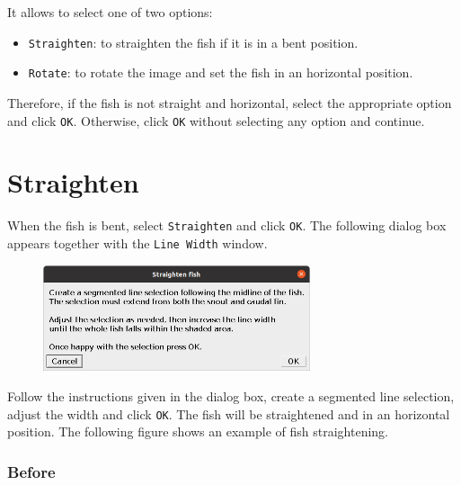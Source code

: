 \documentclass[
  letterpaper,
  DIV=11,
  numbers=noendperiod,
  oneside]{scrreprt}
\providecommand{\tightlist}{%
  \setlength{\itemsep}{0pt}\setlength{\parskip}{0pt}}\usepackage{longtable,booktabs,array}
\begin{document}
It allows to select one of two options:

\begin{itemize}
\tightlist
\item
  \texttt{Straighten}: to straighten the fish if it is in a bent
  position.
\item
  \texttt{Rotate}: to rotate the image and set the fish in an horizontal
  position.
\end{itemize}

Therefore, if the fish is not straight and horizontal, select the
appropriate option and click \texttt{OK}. Otherwise, click \texttt{OK}
without selecting any option and continue.

\hypertarget{straighten}{%
\section*{Straighten}\label{straighten}}

When the fish is bent, select \texttt{Straighten} and click \texttt{OK}.
The following dialog box appears together with the \texttt{Line\ Width}
window.

\begin{figure}

{\centering \includegraphics[width=0.7\textwidth,height=\textheight]{./images/screenshots/straighten_dialog.png}

}

\end{figure}

Follow the instructions given in the dialog box, create a segmented line
selection, adjust the width and click \texttt{OK}. The fish will be
straightened and in an horizontal position. The following figure shows
an example of fish straightening.

\hypertarget{before}{%
\subsubsection{\texorpdfstring{\textbf{Before}}{Before}}\label{before}}
\end{document}
